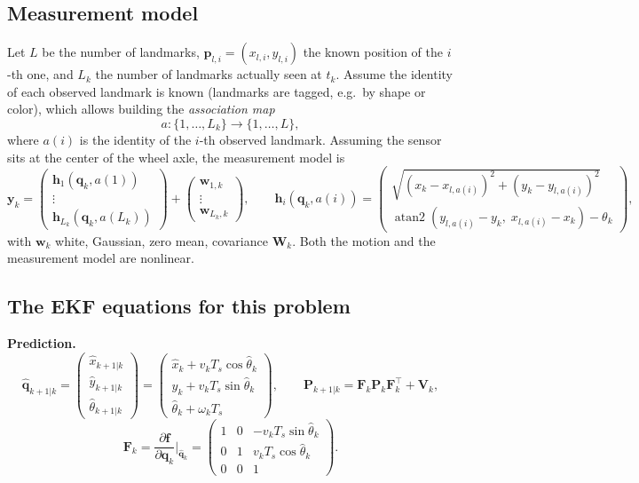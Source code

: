 \documentclass[11pt,a4paper]{article}
\newcommand{\Ts}{T_s}
\newcommand{\hq}{\hat{\boldsymbol{q}}}
\newcommand{\bq}{\boldsymbol{q}}
\newcommand{\by}{\boldsymbol{y}}
\newcommand{\bw}{\boldsymbol{w}}
\newcommand{\mF}{\mathbf{F}}
\newcommand{\mP}{\mathbf{P}}
\newcommand{\mV}{\mathbf{V}}
\newcommand{\mW}{\mathbf{W}}
\newcommand{\tp}{^{\top}}
\DeclareMathOperator{\atantwo}{atan2}
\theoremstyle{plain}
\theoremstyle{definition}
\theoremstyle{remark}
\begin{document}
\subsection{Measurement model}

Let $L$ be the number of landmarks, $\boldsymbol p_{l,i}=(x_{l,i},y_{l,i})$ the known position of the $i$-th one, and $L_k$ the number of landmarks actually seen at $t_k$.
Assume the identity of each observed landmark is known (landmarks are tagged, e.g.\ by shape or color), which allows building the \emph{association map}
\[
a:\{1,\dots,L_k\}\to\{1,\dots,L\},
\]
where $a(i)$ is the identity of the $i$-th observed landmark. Assuming the sensor sits at the center of the wheel axle, the measurement model is
\begin{equation}\label{eq:meas}
\by_k=\begin{pmatrix}\boldsymbol h_1(\bq_k,a(1))\\\vdots\\\boldsymbol h_{L_k}(\bq_k,a(L_k))\end{pmatrix}+\begin{pmatrix}\bw_{1,k}\\\vdots\\\bw_{L_k,k}\end{pmatrix},\qquad
\boldsymbol h_i(\bq_k,a(i))=\begin{pmatrix}\sqrt{(x_k-x_{l,a(i)})^2+(y_k-y_{l,a(i)})^2}\\[2pt]
\atantwo(y_{l,a(i)}-y_k,\;x_{l,a(i)}-x_k)-\theta_k\end{pmatrix},
\end{equation}
with $\bw_k$ white, Gaussian, zero mean, covariance $\mW_k$. Both the motion and the measurement model are nonlinear.

\subsection{The EKF equations for this problem}

\noindent\textbf{Prediction.}
\[
\hq_{k+1|k}=\begin{pmatrix}\hat x_{k+1|k}\\\hat y_{k+1|k}\\\hat\theta_{k+1|k}\end{pmatrix}=\begin{pmatrix}\hat x_k+v_k\Ts\cos\hat\theta_k\\\hat y_k+v_k\Ts\sin\hat\theta_k\\\hat\theta_k+\omega_k\Ts\end{pmatrix},\qquad
\mP_{k+1|k}=\mF_k\mP_k\mF_k\tp+\mV_k,
\]
\begin{equation}\label{eq:F}
\mF_k=\frac{\partial\boldsymbol f}{\partial\bq_k}\Big|_{\hq_k}=\begin{pmatrix}1&0&-v_k\Ts\sin\hat\theta_k\\0&1&v_k\Ts\cos\hat\theta_k\\0&0&1\end{pmatrix}.
\end{equation}
\end{document}
